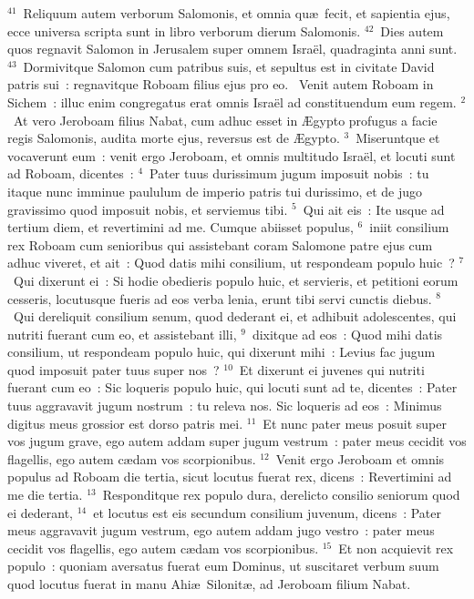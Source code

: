 ${}^{41}$~Reliquum autem verborum Salomonis, et omnia qu\ae\ fecit, et sapientia ejus, ecce universa scripta sunt in libro verborum dierum Salomonis.
${}^{42}$~Dies autem quos regnavit Salomon in Jerusalem super omnem Isra\"el, quadraginta anni sunt.
${}^{43}$~Dormivitque Salomon cum patribus suis, et sepultus est in civitate David patris sui~: regnavitque Roboam filius ejus pro eo.
~\lettrine[lines=10,image=true,loversize=0.05,lraise=-0.03]{V}{}enit autem Roboam in Sichem~: illuc enim congregatus erat omnis Isra\"el ad constituendum eum regem.
${}^{2}$~At vero Jeroboam filius Nabat, cum adhuc esset in \AE gypto profugus a facie regis Salomonis, audita morte ejus, reversus est de \AE gypto.
${}^{3}$~Miseruntque et vocaverunt eum~: venit ergo Jeroboam, et omnis multitudo Isra\"el, et locuti sunt ad Roboam, dicentes~:
${}^{4}$~Pater tuus durissimum jugum imposuit nobis~: tu itaque nunc imminue paululum de imperio patris tui durissimo, et de jugo gravissimo quod imposuit nobis, et serviemus tibi.
${}^{5}$~Qui ait eis~: Ite usque ad tertium diem, et revertimini ad me. Cumque abiisset populus,
${}^{6}$~iniit consilium rex Roboam cum senioribus qui assistebant coram Salomone patre ejus cum adhuc viveret, et ait~: Quod datis mihi consilium, ut respondeam populo huic~?
${}^{7}$~Qui dixerunt ei~: Si hodie obedieris populo huic, et servieris, et petitioni eorum cesseris, locutusque fueris ad eos verba lenia, erunt tibi servi cunctis diebus.
${}^{8}$~Qui dereliquit consilium senum, quod dederant ei, et adhibuit adolescentes, qui nutriti fuerant cum eo, et assistebant illi,
${}^{9}$~dixitque ad eos~: Quod mihi datis consilium, ut respondeam populo huic, qui dixerunt mihi~: Levius fac jugum quod imposuit pater tuus super nos~?
${}^{10}$~Et dixerunt ei juvenes qui nutriti fuerant cum eo~: Sic loqueris populo huic, qui locuti sunt ad te, dicentes~: Pater tuus aggravavit jugum nostrum~: tu releva nos. Sic loqueris ad eos~: Minimus digitus meus grossior est dorso patris mei.
${}^{11}$~Et nunc pater meus posuit super vos jugum grave, ego autem addam super jugum vestrum~: pater meus cecidit vos flagellis, ego autem c\ae dam vos scorpionibus.
${}^{12}$~Venit ergo Jeroboam et omnis populus ad Roboam die tertia, sicut locutus fuerat rex, dicens~: Revertimini ad me die tertia.
${}^{13}$~Responditque rex populo dura, derelicto consilio seniorum quod ei dederant,
${}^{14}$~et locutus est eis secundum consilium juvenum, dicens~: Pater meus aggravavit jugum vestrum, ego autem addam jugo vestro~: pater meus cecidit vos flagellis, ego autem c\ae dam vos scorpionibus.
${}^{15}$~Et non acquievit rex populo~: quoniam aversatus fuerat eum Dominus, ut suscitaret verbum suum quod locutus fuerat in manu Ahi\ae\ Silonit\ae , ad Jeroboam filium Nabat.


